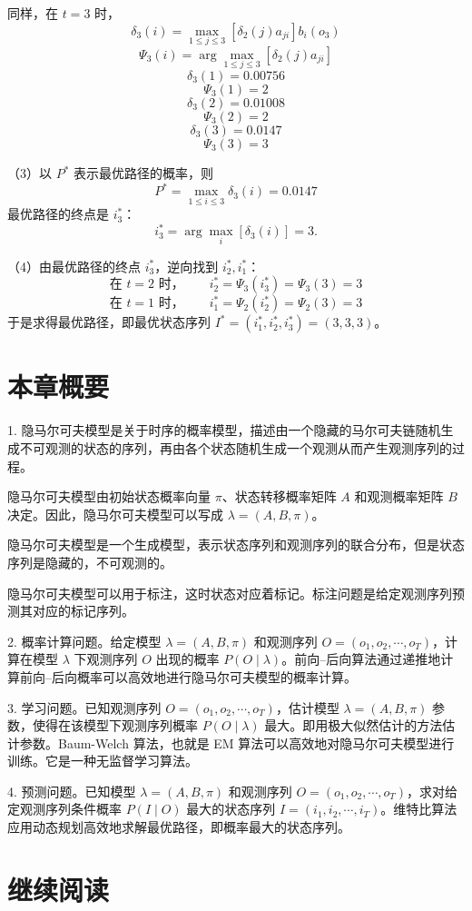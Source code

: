 \documentclass[UTF8,12pt,a4paper,fontset=fandol]{ctexart}
\begin{document}
同样，在 $t=3$ 时，
\[
  \delta_3(i)=\max_{1\le j\le3}[\delta_2(j)a_{ji}]b_i(o_3)
\]
\[
  \Psi_3(i)=\arg\max_{1\le j\le3}[\delta_2(j)a_{ji}]
\]
\[
  \delta_3(1)=0.00756
\]
\[
  \Psi_3(1)=2
\]
\[
  \delta_3(2)=0.01008
\]
\[
  \Psi_3(2)=2
\]
\[
  \delta_3(3)=0.0147
\]
\[
  \Psi_3(3)=3
\]

（3）以 $P^*$ 表示最优路径的概率，则
\[
  P^*=\max_{1\le i\le3}\delta_3(i)=0.0147
\]
最优路径的终点是 $i_3^*$：
\[
  i_3^*=\arg\max_i[\delta_3(i)]=3.
\]

（4）由最优路径的终点 $i_3^*$，逆向找到 $i_2^*,i_1^*$：
\[
  \text{在 }t=2\text{ 时，}\qquad i_2^*=\Psi_3(i_3^*)=\Psi_3(3)=3
\]
\[
  \text{在 }t=1\text{ 时，}\qquad i_1^*=\Psi_2(i_2^*)=\Psi_2(3)=3
\]
于是求得最优路径，即最优状态序列 $I^*=(i_1^*,i_2^*,i_3^*)=(3,3,3)$。

\section*{本章概要}

1. 隐马尔可夫模型是关于时序的概率模型，描述由一个隐藏的马尔可夫链随机生成不可观测的状态的序列，再由各个状态随机生成一个观测从而产生观测序列的过程。

隐马尔可夫模型由初始状态概率向量 $\pi$、状态转移概率矩阵 $A$ 和观测概率矩阵 $B$ 决定。因此，隐马尔可夫模型可以写成 $\lambda=(A,B,\pi)$。

隐马尔可夫模型是一个生成模型，表示状态序列和观测序列的联合分布，但是状态序列是隐藏的，不可观测的。

隐马尔可夫模型可以用于标注，这时状态对应着标记。标注问题是给定观测序列预测其对应的标记序列。

2. 概率计算问题。给定模型 $\lambda=(A,B,\pi)$ 和观测序列 $O=(o_1,o_2,\cdots,o_T)$，计算在模型 $\lambda$ 下观测序列 $O$ 出现的概率 $P(O\mid\lambda)$。前向--后向算法通过递推地计算前向--后向概率可以高效地进行隐马尔可夫模型的概率计算。

3. 学习问题。已知观测序列 $O=(o_1,o_2,\cdots,o_T)$，估计模型 $\lambda=(A,B,\pi)$ 参数，使得在该模型下观测序列概率 $P(O\mid\lambda)$ 最大。即用极大似然估计的方法估计参数。Baum-Welch 算法，也就是 EM 算法可以高效地对隐马尔可夫模型进行训练。它是一种无监督学习算法。

4. 预测问题。已知模型 $\lambda=(A,B,\pi)$ 和观测序列 $O=(o_1,o_2,\cdots,o_T)$，求对给定观测序列条件概率 $P(I\mid O)$ 最大的状态序列 $I=(i_1,i_2,\cdots,i_T)$。维特比算法应用动态规划高效地求解最优路径，即概率最大的状态序列。

\section*{继续阅读}
\end{document}
